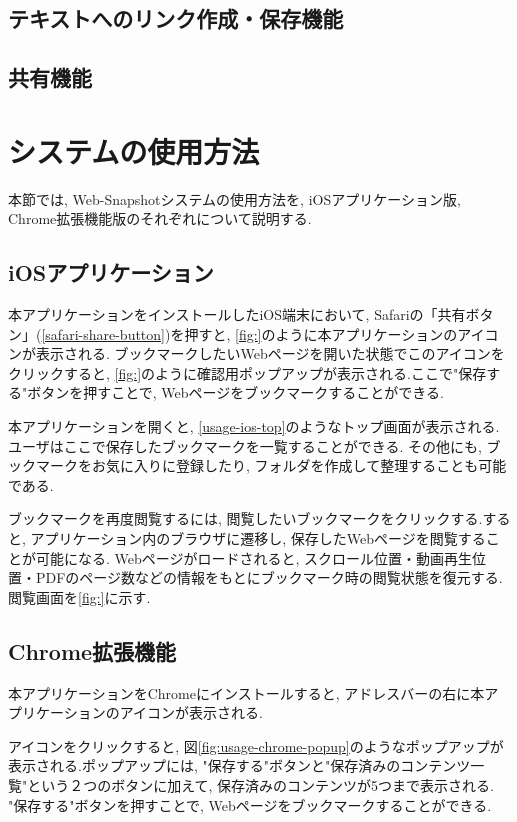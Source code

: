 \subsection{テキストへのリンク作成・保存機能}
\subsection{共有機能}

\section{システムの使用方法}
本節では, Web-Snapshotシステムの使用方法を, iOSアプリケーション版, Chrome拡張機能版のそれぞれについて説明する.

\subsection{iOSアプリケーション}
本アプリケーションをインストールしたiOS端末において, Safariの「共有ボタン」(\ref{safari-share-button})を押すと, \ref{fig:}のように本アプリケーションのアイコンが表示される.
ブックマークしたいWebページを開いた状態でこのアイコンをクリックすると, \ref{fig:}のように確認用ポップアップが表示される.ここで"保存する"ボタンを押すことで, Webページをブックマークすることができる.

本アプリケーションを開くと, \ref{usage-ios-top}のようなトップ画面が表示される.ユーザはここで保存したブックマークを一覧することができる.
その他にも, ブックマークをお気に入りに登録したり, フォルダを作成して整理することも可能である.

ブックマークを再度閲覧するには, 閲覧したいブックマークをクリックする.すると, アプリケーション内のブラウザに遷移し, 保存したWebページを閲覧することが可能になる.
Webページがロードされると, スクロール位置・動画再生位置・PDFのページ数などの情報をもとにブックマーク時の閲覧状態を復元する.
閲覧画面を\ref{fig:}に示す.

\subsection{Chrome拡張機能}
本アプリケーションをChromeにインストールすると, アドレスバーの右に本アプリケーションのアイコンが表示される.

アイコンをクリックすると, 図\ref{fig:usage-chrome-popup}のようなポップアップが表示される.ポップアップには, "保存する"ボタンと"保存済みのコンテンツ一覧"という２つのボタンに加えて, 保存済みのコンテンツが5つまで表示される.
"保存する"ボタンを押すことで, Webページをブックマークすることができる.

